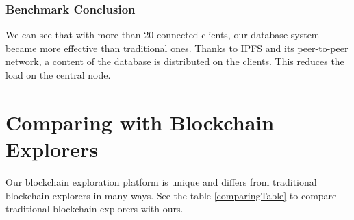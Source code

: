 \subsubsection{Benchmark Conclusion}
We can see that with more than 20 connected clients, our database system became more effective than traditional ones. Thanks to IPFS and its peer-to-peer network, a content of the database is distributed on the clients. This reduces the load on the central node.

\section{Comparing with Blockchain Explorers}
Our blockchain exploration platform is unique and differs from traditional blockchain explorers in many ways. See the table \ref{comparingTable} to compare traditional blockchain explorers with ours. 

